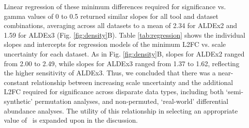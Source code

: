 \documentclass[10pt,letterpaper]{article}
\begin{document}
Linear regression of these minimum differences required for significance vs. gamma values of 0 to 0.5 returned similar slopes for all tool and dataset combinations, averaging across all datasets to a mean of 2.34 for ALDEx2 and 1.59 for ALDEx3 (Fig. \ref{fig:density}B). Table \ref{tab:regression} shows the individual slopes and intercepts for regression models of the minimum L2FC vs. scale uncertainty for each dataset. As in Fig. \ref{fig:density}B, slopes for ALDEx2 ranged from 2.00 to 2.49, while slopes for ALDEx3 ranged from 1.37 to 1.62, reflecting the higher sensitivity of ALDEx3. Thus, we concluded that there was a near-constant relationship between increasing scale uncertainty and the additional L2FC required for significance across disparate data types, including both `semi-synthetic' permutation analyses, and non-permuted, `real-world' differential abundance analyses. The utility of this relationship in selecting an appropriate value of \textgamma~is expanded upon in the discussion.
\end{document}

